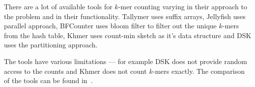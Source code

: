 There are a lot of available tools for $k$-mer counting varying in their approach to the problem and in their functionality. Tallymer uses suffix arrays, Jellyfish uses parallel approach, BFCounter uses bloom filter to filter out the unique $k$-mers from the hash table, Khmer uses count-min sketch as it's data structure and DSK uses the partitioning approach.

The tools have various limitations --- for example DSK does not provide random access to the counts and Khmer does not count $k$-mers exactly.
The comparison of the tools can be found in~\cite{khmer}.
